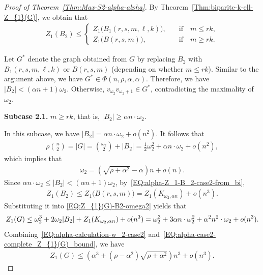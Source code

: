 \documentclass[11pt,a4paper]{article}
\begin{document}
\begin{proof}[Proof of Theorem~\ref{Thm:Max-S2-alpha-alpha}]
By Theorem~\ref{Thm:biparite-k-ell-Z_{1}(G)}, we obtain that 
\begin{align}\label{EQ:alpha-Z_1-B_2-case2-from_bi}
 Z_{1}(B_2)
        \le 
        \begin{cases}
            Z_{1}\big(B_1(r,s,m,\ell,k) \big), &\quad\text{if}\quad m \le rk,  \\[0.5em] 
            Z_{1}\big(B(r,s,m) \big), &\quad\text{if}\quad m \ge r k. 
        \end{cases}
\end{align}

Let $G^{\ast}$ denote the graph obtained from $G$ by replacing $B_2$ with $B_1(r,s,m,\ell,k)$ or $B(r,s,m)$ (depending on whether $m \le rk$). 
Similar to the argument above, we have $G^{\ast} \in \Phi(n, \rho, \alpha, \alpha)$. 
Therefore, we have $|B_2| < (\alpha n+1) \omega_2$. 
Otherwise, $v_{\omega_2} v_{\omega_2 +1} \in G^{\ast}$, contradicting the maximality of $\omega_2$. 

\textbf{Subcase 2.1.} $m \ge rk$, that is, $|B_2| \ge \alpha n \cdot \omega_2$. 

In this subcase, we have $|B_2| = \alpha n \cdot \omega_2 + o(n^2)$. 
It follows that 
\begin{align*}
\rho \binom{n}{2} 
= |G| 
= \binom{\omega_2}{2} + |B_2|
= \frac{1}{2} \omega_2^2 + \alpha n \cdot \omega_2 + o(n^2), 
\end{align*}
which implies that 
\begin{align}\label{EQ:alpha-calculation-w_2-case2}
\omega_2
= \left(\sqrt{\rho + \alpha^2} - \alpha \right)n + o(n). 
\end{align}
Since $\alpha n \cdot \omega_2 \le |B_2| < (\alpha n+1) \omega_2$, by~\eqref{EQ:alpha-Z_1-B_2-case2-from_bi}, 
\begin{align*}
Z_{1}(B_2) 
\le Z_{1}\big(B(r,s,m) \big)
= Z_{1}\left(K_{\omega_2, \alpha n}\right) + o(n^3). 
\end{align*}
Substituting it into \eqref{EQ:Z_{1}(G)-B2-omega2} yields that 
\begin{align}\label{EQ:alpha-case2-complete_Z_{1}(G)_bound}
Z_{1}(G) 
\le \omega_2^3 + 2 \omega_2 |B_2| + Z_{1}(K_{\omega_2, \alpha n}) + o(n^3) 
= \omega_2^3 + 3 \alpha n \cdot \omega_2^2 + \alpha^2 n^2 \cdot \omega_2 + o(n^3). 
\end{align}
Combining~\eqref{EQ:alpha-calculation-w_2-case2} and~\eqref{EQ:alpha-case2-complete_Z_{1}(G)_bound}, we have 
\begin{align*}
Z_{1}(G) \le \left(\alpha^3+(\rho-\alpha^2)\sqrt{\rho+\alpha^2}\right) n^3 
+ o(n^3). 
\end{align*}


\end{proof}
\end{document}
